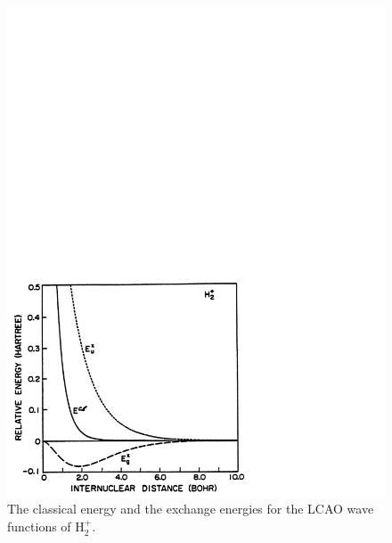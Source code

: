 \begin{figure}
\includegraphics[scale=0.75]{fig2-13}
\caption{The classical energy and the exchange energies for the LCAO
  wave functions of H$_2^+$.}
\label{fig2-13}
\end{figure}

